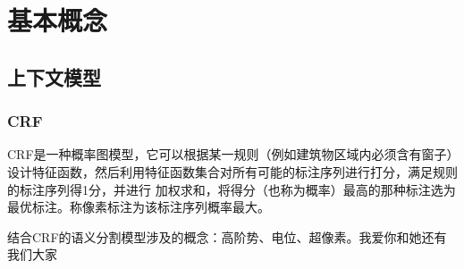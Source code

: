 \chapter{基本概念}
\section{上下文模型}
\subsection{CRF}
\hspace{2em}CRF是一种概率图模型，它可以根据某一规则（例如建筑物区域内必须含有窗子）设计特征函数，然后利用特征函数集合对所有可能的标注序列进行打分，满足规则的标注序列得1分，并进行
加权求和，将得分（也称为概率）最高的那种标注选为最优标注。称像素标注为该标注序列概率最大。\par
结合CRF的语义分割模型涉及的概念：高阶势、电位、超像素。我爱你和她还有我们大家

